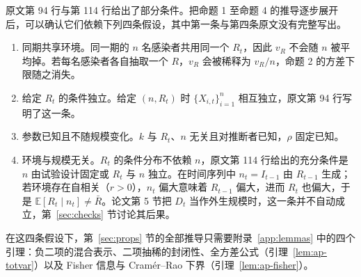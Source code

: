 原文第 94 行与第 114 行给出了部分条件。把命题 1 至命题 4 的推导逐步展开后，可以确认它们依赖下列四条假设，其中第一条与第四条原文没有完整写出。

\begin{enumerate}
\item 同期共享环境。同一期的 $n$ 名感染者共用同一个 $R_t$，因此 $v_R$ 不会随 $n$ 被平均掉。若每名感染者各自抽取一个 $R$，$v_R$ 会被稀释为 $v_R/n$，命题 2 的方差下限随之消失。
\item 给定 $R_t$ 的条件独立。给定 $(n,R_t)$ 时 $\{X_{i,t}\}_{i=1}^n$ 相互独立，原文第 94 行写明了这一条。
\item 参数已知且不随规模变化。$k$ 与 $R_t$、$n$ 无关且对推断者已知，$\rho$ 固定已知。
\item 环境与规模无关。$R_t$ 的条件分布不依赖 $n$，原文第 114 行给出的充分条件是 $n$ 由试验设计固定或 $R_t$ 与 $n$ 独立。在时间序列中 $n_t=I_{t-1}$ 由 $R_{t-1}$ 生成；若环境存在自相关（$r>0$），$n_t$ 偏大意味着 $R_{t-1}$ 偏大，进而 $R_t$ 也偏大，于是 $\mathbb{E}[R_t\mid n_t]\neq\bar R$。论文第 5 节把 $D_t$ 当作外生规模时，这一条并不自动成立，第~\ref{sec:checks} 节讨论其后果。
\end{enumerate}

在这四条假设下，第~\ref{sec:props} 节的全部推导只需要附录~\ref{app:lemmas} 中的四个引理：负二项的混合表示、二项抽稀的封闭性、全方差公式（引理~\ref{lem:ap-totvar}）以及 Fisher 信息与 Cram\'er--Rao 下界（引理~\ref{lem:ap-fisher}）。
